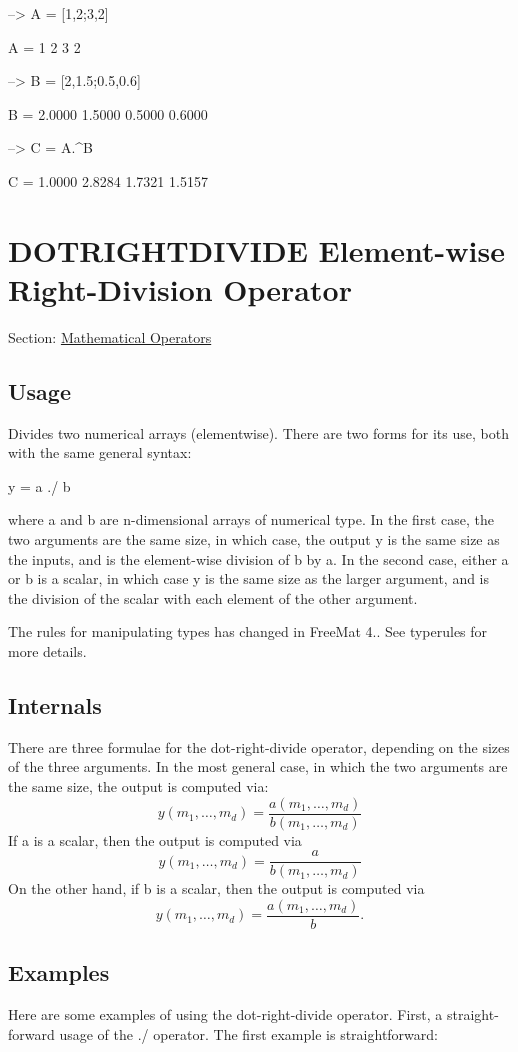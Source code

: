 \begin{DoxyVerbInclude}
--> A = [1,2;3,2]

A = 
 1 2 
 3 2 

--> B = [2,1.5;0.5,0.6]

B = 
    2.0000    1.5000 
    0.5000    0.6000 

--> C = A.^B

C = 
    1.0000    2.8284 
    1.7321    1.5157 
\end{DoxyVerbInclude}
 \hypertarget{operators_dotrightdivide}{}\section{D\-O\-T\-R\-I\-G\-H\-T\-D\-I\-V\-I\-D\-E Element-\/wise Right-\/\-Division Operator}\label{operators_dotrightdivide}
Section\-: \hyperlink{sec_operators}{Mathematical Operators} \hypertarget{vtkwidgets_vtkxyplotwidget_Usage}{}\subsection{Usage}\label{vtkwidgets_vtkxyplotwidget_Usage}
Divides two numerical arrays (elementwise). There are two forms for its use, both with the same general syntax\-: \begin{DoxyVerb}  y = a ./ b
\end{DoxyVerb}
 where {\ttfamily a} and {\ttfamily b} are {\ttfamily n}-\/dimensional arrays of numerical type. In the first case, the two arguments are the same size, in which case, the output {\ttfamily y} is the same size as the inputs, and is the element-\/wise division of {\ttfamily b} by {\ttfamily a}. In the second case, either {\ttfamily a} or {\ttfamily b} is a scalar, in which case {\ttfamily y} is the same size as the larger argument, and is the division of the scalar with each element of the other argument.

The rules for manipulating types has changed in Free\-Mat 4.. See {\ttfamily typerules} for more details.\hypertarget{transforms_svd_Function}{}\subsection{Internals}\label{transforms_svd_Function}
There are three formulae for the dot-\/right-\/divide operator, depending on the sizes of the three arguments. In the most general case, in which the two arguments are the same size, the output is computed via\-: \[ y(m_1,\ldots,m_d) = \frac{a(m_1,\ldots,m_d)}{b(m_1,\ldots,m_d)} \] If {\ttfamily a} is a scalar, then the output is computed via \[ y(m_1,\ldots,m_d) = \frac{a}{b(m_1,\ldots,m_d)} \] On the other hand, if {\ttfamily b} is a scalar, then the output is computed via \[ y(m_1,\ldots,m_d) = \frac{a(m_1,\ldots,m_d)}{b}. \] \hypertarget{variables_matrix_Examples}{}\subsection{Examples}\label{variables_matrix_Examples}
Here are some examples of using the dot-\/right-\/divide operator. First, a straight-\/forward usage of the {\ttfamily ./} operator. The first example is straightforward\-:


